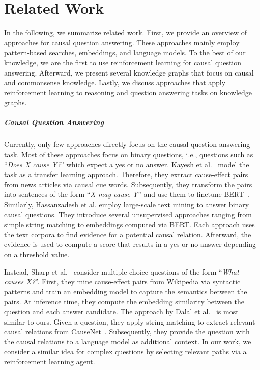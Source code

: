 %
\chapter{Related Work}
\label{sec:related}

In the following, we summarize related work. First, we
provide an overview of approaches for causal question answering. These approaches mainly employ pattern-based searches, embeddings, and language models. To the best of our knowledge, we are the first to use reinforcement learning for causal question answering. Afterward, we present several knowledge graphs that focus on causal and commonsense knowledge. Lastly, we discuss approaches that apply reinforcement learning to reasoning and question answering tasks on knowledge graphs.
\paragraph{Causal Question Answering}

Currently, only few approaches directly focus on the causal question answering task. Most of these approaches focus on binary questions, i.e., questions such as ``\textit{Does X cause Y?}'' which expect a yes or no answer. 
Kayesh et al.~\cite{KayeshCausalTransfer2020} model the task as a transfer learning approach. Therefore, they extract cause-effect pairs from news articles via causal cue words. Subsequently, they transform the pairs into sentences of the form ``\textit{X may cause Y}'' and use them to finetune BERT~\cite{DevlinBert2019}. Similarly, Hassanzadesh et al. \cite{HassanzadeshCausalQA2019} employ large-scale text mining to answer binary causal questions. They introduce several unsupervised approaches ranging from simple string matching to embeddings computed via BERT. Each approach uses the text corpora to find evidence for a potential causal relation. Afterward, the evidence is used to compute a score that results in a yes or no answer depending on a threshold value.


Instead, Sharp et al.~\cite{SharpCausalQAEmbeddings2016} consider multiple-choice questions of the form ``\textit{What causes X?}''. First, they mine cause-effect pairs from Wikipedia via syntactic patterns and train an embedding model to capture the semantics between the pairs. At inference time, they compute the embedding similarity between the question and each answer candidate. The approach by Dalal et al.~\cite{DalalCausalQAEnhancing2021, DalalCausalQAISWC2021} is most similar to ours.
Given a question, they apply string matching to extract relevant causal relations from CauseNet~\cite{Heindorf2020Causenet}. Subsequently, they provide the question with the causal relations to a language model as additional context. In our work, we consider a similar idea for complex questions by selecting relevant paths via a reinforcement learning agent.

